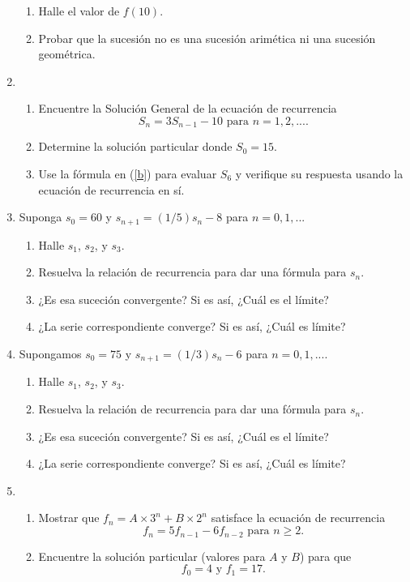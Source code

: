 \documentclass[12pt, a4paper]{book}
\begin{document}
\begin{enumerate}
\begin{enumerate}
        \item Halle el valor de $f(10).$ 
        \item Probar que la sucesión no es una sucesión arimética ni una sucesión geométrica.
    \end{enumerate}
    \item \begin{enumerate}
        \item Encuentre la Solución General de la ecuación de recurrencia $$S_n=3S_{n-1}-10\text{  para }n=1,2,....$$
        \item\label{b} Determine la solución particular donde $S_0=15$.
        \item Use la fórmula en (\ref{b}) para evaluar $S_6$ y verifique su respuesta usando la ecuación de recurrencia en sí.
    \end{enumerate}
    \item Suponga $s_0=60$ y $s_{n+1}=(1/5)s_n-8$ para $n=0,1,...$
    \begin{enumerate}
        \item Halle $s_1$, $s_2$, y $s_3$.
        \item Resuelva la relación de recurrencia para dar una fórmula para $s_n$.
        \item ¿Es esa suceción convergente? Si es así, ¿Cuál es el límite?
        \item ¿La serie correspondiente converge? Si es así, ¿Cuál es límite?
    \end{enumerate}
    \item Supongamos $s_0=75$ y $s_{n+1}=(1/3)s_n - 6$ para $n=0,1, ....$
    \begin{enumerate}
        \item Halle $s_1$, $s_2$, y $s_3$.
         \item Resuelva la relación de recurrencia para dar una fórmula para $s_n$.
        \item ¿Es esa suceción convergente? Si es así, ¿Cuál es el límite?
        \item ¿La serie correspondiente converge? Si es así, ¿Cuál es límite?
    \end{enumerate}
    \item \begin{enumerate}
        \item Mostrar que $f_n=A\times 3^n + B\times 2^n$ satisface la ecuación de recurrencia $$f_n=5f_{n-1}-6f_{n-2}\text{ para } n\geq 2.$$
        \item Encuentre la solución particular (valores para $A$ y $B$) para que $$f_0=4\text{ y }f_1=17.$$
    \end{enumerate}

\end{enumerate}
\end{document}
